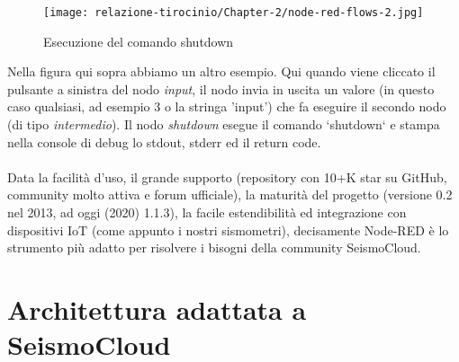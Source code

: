 \documentclass[a4paper,10pt]{memoir}
\begin{document}
\begin{figure}[H]
\caption{Esecuzione del comando shutdown}
\label{fig:node-red-flows-example2}
\texttt{[image: relazione-tirocinio/Chapter-2/node-red-flows-2.jpg]}
\end{figure}
Nella figura qui sopra abbiamo un altro esempio. Qui quando viene cliccato il pulsante a sinistra del nodo \textit{input}, il nodo invia in uscita un valore (in questo caso qualsiasi, ad esempio 3 o la stringa 'input') che fa eseguire il secondo nodo (di tipo \textit{intermedio}). Il nodo \textit{shutdown} esegue il comando `shutdown` e stampa nella console di debug lo stdout, stderr ed il return code.
\\
\\
Data la facilità d'uso, il grande supporto (repository con 10+K star su GitHub, community molto attiva e forum ufficiale), la maturità del progetto (versione 0.2 nel 2013, ad oggi (2020) 1.1.3), la facile estendibilità ed integrazione con dispositivi IoT (come appunto i nostri sismometri), decisamente Node-RED è lo strumento più adatto per risolvere i bisogni della community SeismoCloud.
\\
\clearpage

\section{Architettura adattata a SeismoCloud}
\end{document}
